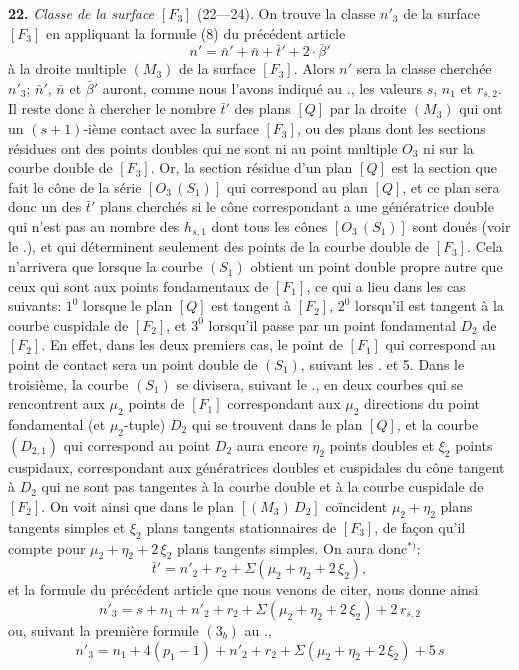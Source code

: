 \documentclass{article}
\begin{document}
\textbf{22.} \emph{Classe de la surface $[F_3]$} (22---24). On trouve la classe $n'_3$ de la surface $[F_3]$ en appliquant la formule (8) du précédent article
\[
n' = \bar{n}' + \bar{n} + \bar{t}' + 2\cdot \bar{\beta}'
\]
à la droite multiple $(M_3)$ de la surface $[F_3]$. Alors $n'$ sera la classe cherchée $n'_3$; $\bar{n}'$, $\bar{n}$ et $\bar{\beta}'$ auront, comme nous l'avons indiqué au ., les valeurs $s$, $n_1$ et $r_{s, 2}$. Il reste donc à chercher le nombre $\bar{t}'$ des plans $[Q]$ par la droite $(M_3)$ qui ont un $(s + 1)$-ième contact avec la surface $[F_3]$, ou des plans dont les sections résidues ont des points doubles qui ne sont ni au point multiple $O_3$ ni sur la courbe double de $[F_3]$. Or, la section résidue d'un plan $[Q]$ est la section que fait le cône de la série $[O_3\,(S_1)]$ qui correspond au plan $[Q]$, et ce plan sera donc un des $\bar{t}'$ plans cherchés si le cône correspondant a une génératrice double qui n'est pas au nombre des $h_{s, 1}$ dont tous les cônes $[O_3\,(S_1)]$ sont doués (voir le .), et qui déterminent seulement des points de la courbe double de $[F_3]$. Cela n'arrivera que lorsque la courbe $(S_1)$ obtient un point double propre autre que ceux qui sont aux points fondamentaux de $[F_1]$, ce qui a lieu dans les cas suivants: $1^0$ lorsque le plan $[Q]$ est tangent à $[F_2]$, $2^0$ lorsqu'il est tangent à la courbe cuspidale de $[F_2]$, et $3^0$ lorsqu'il passe par un point fondamental $D_2$ de $[F_2]$. En effet, dans les deux premiers cas, le point de $[F_1]$ qui correspond au point de contact sera un point double de $(S_1)$, suivant les . et 5. Dans le troisième, la courbe $(S_1)$ se divisera, suivant le ., en deux courbes qui se rencontrent aux $\mu_2$ points de $[F_1]$ correspondant aux $\mu_2$ directions du point fondamental (et $\mu_2$-tuple) $D_2$ qui se trouvent dans le plan $[Q]$, et la courbe $(D_{2, 1})$ qui correspond au point $D_2$ aura encore $\eta_2$ points doubles et $\xi_2$ points cuspidaux, correspondant aux génératrices doubles et cuspidales du cône tangent à $D_2$ qui ne sont pas tangentes à la courbe double et à la courbe cuspidale de $[F_2]$. On voit ainsi que dans le plan $[(M_3)\,D_2]$ coïncident $\mu_2 + \eta_2$ plans tangents simples et $\xi_2$ plans tangents stationnaires de $[F_3]$, de façon qu'il compte pour $\mu_2 + \eta_2 + 2\,\xi_2$ plans tangents simples. On aura donc${}^{*)}$:
\[
\bar{t}' = n'_2 + r_2 + \Sigma(\mu_2 + \eta_2 + 2\,\xi_2),
\]
et la formule du précédent article que nous venons de citer, nous donne ainsi
\[
n'_3 = s + n_1 + n'_2 + r_2 + \Sigma(\mu_2 + \eta_2 + 2\,\xi_2) + 2\,r_{s, 2} \tag{$6_a$}
\]
ou, suivant la première formule $(3_b)$ au .,
\[
n'_3 = n_1 + 4(p_1 - 1) + n'_2 + r_2 + \Sigma(\mu_2 + \eta_2 + 2\,\xi_2) + 5\,s \tag{$6_b$}
\]
\end{document}
